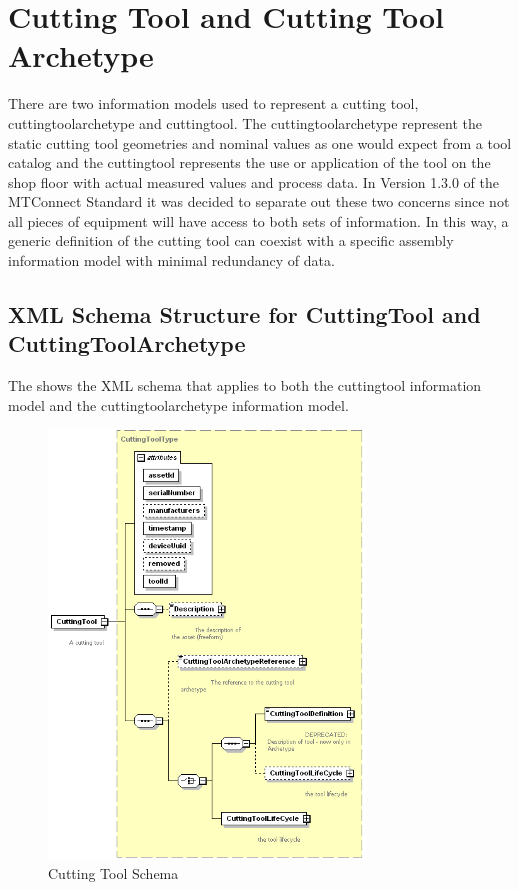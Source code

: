 \section{Cutting Tool and Cutting Tool Archetype} 
\label{cutting-tool-and-cutting-tool-archetype}
There are two \glspl{information model} used to represent a cutting tool, \gls{cuttingtoolarchetype} and \gls{cuttingtool}.  The \gls{cuttingtoolarchetype} represent the static cutting tool geometries and nominal values as one would expect from a tool catalog and the \gls{cuttingtool} represents the use or application of the tool on the shop floor with actual measured values and process data.  In Version 1.3.0 of the MTConnect Standard it was decided to separate out these two concerns since not all pieces of equipment will have access to both sets of information.  In this way, a generic definition of the cutting tool can coexist with a specific assembly \gls{information model} with minimal redundancy of data.

\subsection{XML Schema Structure for CuttingTool and CuttingToolArchetype}
The  shows the XML schema that applies to both the \gls{cuttingtool} \gls{information model} and the \gls{cuttingtoolarchetype} \gls{information model}.

\begin{figure}[ht]
  \centering
  \includegraphics[width=0.75\textwidth]{figures/cuttingtool-schema.png}
  \caption{Cutting Tool Schema}
  \label{fig:cuttingtool-schema}
\end{figure}

